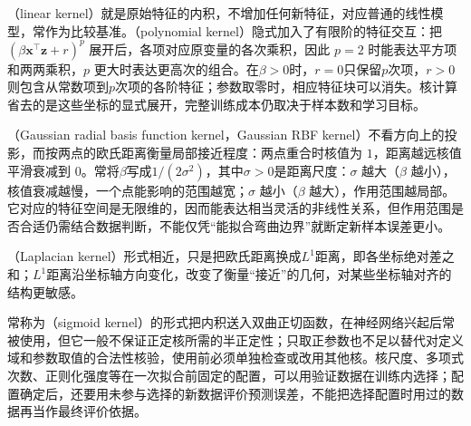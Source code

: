 （linear kernel）就是原始特征的内积，不增加任何新特征，对应普通的线性模型，常作为比较基准。（polynomial kernel）隐式加入了有限阶的特征交互：把 $(\beta\bm x^\top\bm z+r)^p$ 展开后，各项对应原变量的各次乘积，因此 $p=2$ 时能表达平方项和两两乘积，$p$ 更大时表达更高次的组合。在$\beta>0$时，$r=0$只保留$p$次项，$r>0$则包含从常数项到$p$次项的各阶特征；参数取零时，相应特征块可以消失。核计算省去的是这些坐标的显式展开，完整训练成本仍取决于样本数和学习目标。

（Gaussian radial basis function kernel，Gaussian RBF kernel）不看方向上的投影，而按两点的欧氏距离衡量局部接近程度：两点重合时核值为 $1$，距离越远核值平滑衰减到 $0$。常将$\beta$写成$1/(2\sigma^2)$，其中$\sigma>0$是距离尺度：$\sigma$ 越大（$\beta$ 越小），核值衰减越慢，一个点能影响的范围越宽；$\sigma$ 越小（$\beta$ 越大），作用范围越局部。它对应的特征空间是无限维的，因而能表达相当灵活的非线性关系，但作用范围是否合适仍需结合数据判断，不能仅凭“能拟合弯曲边界”就断定新样本误差更小。

（Laplacian kernel）形式相近，只是把欧氏距离换成$L^1$距离，即各坐标绝对差之和；$L^1$距离沿坐标轴方向变化，改变了衡量“接近”的几何，对某些坐标轴对齐的结构更敏感。

常称为（sigmoid kernel）的形式把内积送入双曲正切函数，在神经网络兴起后常被使用，但它一般不保证正定核所需的半正定性；只取正参数也不足以替代对定义域和参数取值的合法性核验，使用前必须单独检查或改用其他核。核尺度、多项式次数、正则化强度等在一次拟合前固定的配置，可以用验证数据在训练内选择；配置确定后，还要用未参与选择的新数据评价预测误差，不能把选择配置时用过的数据再当作最终评价依据。
